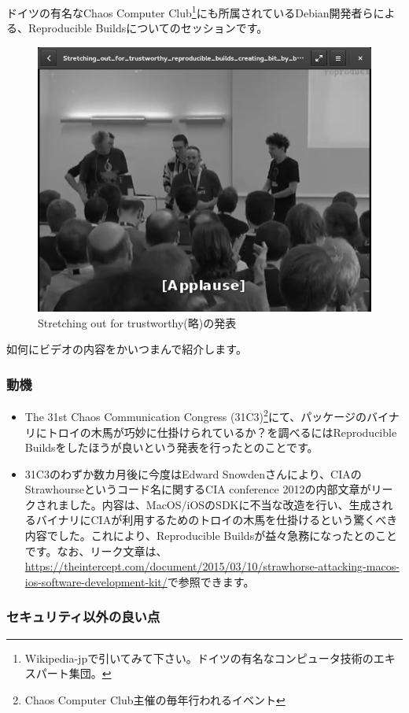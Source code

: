 \documentclass[mingoth,a4paper]{jsarticle}
\begin{document}
 ドイツの有名なChaos Computer Club\footnote{Wikipedia-jpで引いてみて下さい。ドイツの有名なコンピュータ技術のエキスパート集団。}にも所属されているDebian開発者らによる、Reproducible Buildsについてのセッションです。

\begin{figure}[H]
\begin{center}
\includegraphics[width=0.5\hsize]{image201510/reproduct_mono.png}
\end{center}
\caption{Stretching out for trustworthy(略)の発表}
\end{figure}

如何にビデオの内容をかいつまんで紹介します。

\subsubsection{動機}

 \begin{itemize}
 \item The 31st Chaos Communication Congress (31C3)\footnote{Chaos Computer Club主催の毎年行われるイベント}にて、パッケージのバイナリにトロイの木馬が巧妙に仕掛けられているか？を調べるにはReproducible Buildsをしたほうが良いという発表を行ったとのことです。
\item 31C3のわずか数カ月後に今度はEdward Snowdenさんにより、CIAのStrawhourseというコード名に関するCIA conference 2012の内部文章がリークされました。内容は、MacOS/iOSのSDKに不当な改造を行い、生成されるバイナリにCIAが利用するためのトロイの木馬を仕掛けるという驚くべき内容でした。これにより、Reproducible Buildsが益々急務になったとのことです。なお、リーク文章は、\url{https://theintercept.com/document/2015/03/10/strawhorse-attacking-macos-ios-software-development-kit/}で参照できます。
 \end{itemize}

\subsubsection{セキュリティ以外の良い点}
\end{document}
